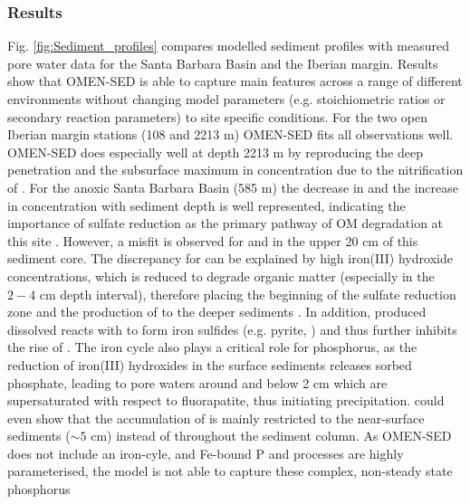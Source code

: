 \documentclass[gmd, manuscript]{copernicus}
\begin{document}
\subsubsection{Results}
Fig. \ref{fig:Sediment_profiles} compares modelled sediment profiles with measured pore water data for the Santa Barbara Basin and the Iberian margin. Results show 
that OMEN-SED is able to capture main features across a range of different environments without changing model parameters (e.g. stoichiometric ratios or secondary reaction parameters) to site specific conditions. 
For the two open Iberian margin stations (108 and 2213 m) OMEN-SED fits all observations well. OMEN-SED does especially well at depth 2213 m by reproducing the deep  penetration and the subsurface maximum in  
concentration due to the nitrification of . For the anoxic Santa Barbara Basin (585 m) the decrease in  and the increase in  concentration with sediment depth is well represented, indicating the 
importance of sulfate reduction as the primary pathway of OM degradation at this site \citep[compare][]{meysman_reactive_2003}. 
However, a misfit is observed for  and  in the upper 20 cm of this sediment core. The discrepancy for  can be explained by high iron(III) hydroxide concentrations, 
which is reduced to degrade organic matter (especially in the $2-4$ cm depth interval), therefore placing the beginning of the sulfate reduction zone and the production of  to the deeper sediments \citep{reimers_porewater_1996}. 
In addition, produced dissolved  reacts with  to form iron sulfides (e.g. pyrite, ) and thus further inhibits the rise of  \citep{reimers_seasonal_1990}. 
The iron cycle also plays a critical role for phosphorus, as the reduction of iron(III) hydroxides in the surface sediments releases sorbed phosphate, leading to pore waters around and below 2 cm which are supersaturated with 
respect to fluorapatite, thus initiating  precipitation. \citet{reimers_porewater_1996} could even show that the accumulation of  is mainly restricted to the near-surface sediments ($\sim 5$ cm) 
instead of throughout the sediment column. %
As OMEN-SED does not include an iron-cyle, and Fe-bound P and  processes are highly parameterised, the model is not able to capture these complex, non-steady state phosphorus 
\end{document}
